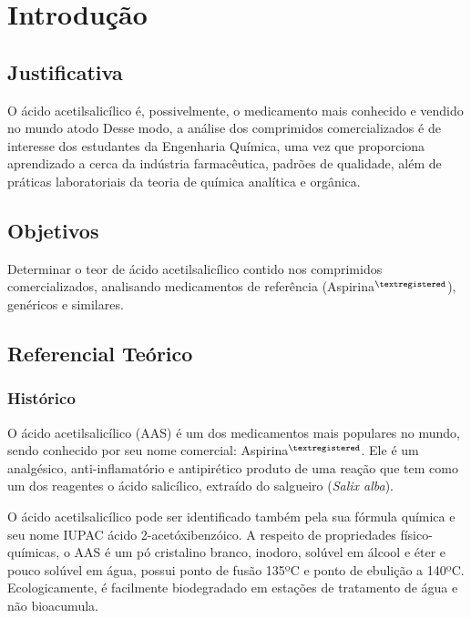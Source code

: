 \chapter{Introdução}\label{intro}
\section{Justificativa}\label{sub:just}    

O ácido acetilsalicílico é, possivelmente, o medicamento mais conhecido e vendido no mundo atodo
Desse modo, a análise dos comprimidos comercializados é de interesse dos estudantes da Engenharia Química,
uma vez que proporciona aprendizado a cerca da indústria farmacêutica, padrões de qualidade, além de
práticas laboratoriais da teoria de química analítica e orgânica.

\section{Objetivos}\label{sub:Objetivos}
Determinar o teor de ácido acetilsalicílico contido nos comprimidos comercializados, analisando
medicamentos de referência (Aspirina$^{\tiny{\textregistered}}$), genéricos e similares.

\section{Referencial Teórico}\label{sub:reft}

\subsection{Histórico}\label{sub:Histórico}

O ácido acetilsalicílico (AAS) é um dos medicamentos mais populares no mundo, sendo conhecido por seu nome
comercial: Aspirina$^{\tiny{\textregistered}}$. Ele é um analgésico, anti-inflamatório e antipirético
produto de uma reação que tem como um dos reagentes o ácido salicílico, extraído do salgueiro (\textit{Salix
    alba}).  

O ácido acetilsalicílico pode ser identificado também pela sua fórmula química  e seu nome IUPAC
ácido 2-acetóxibenzóico. A respeito de propriedades físico-químicas, o AAS é um pó cristalino branco,
inodoro, solúvel em álcool e éter e pouco solúvel em água, possui ponto de fusão 135ºC e ponto de ebulição
a 140ºC. Ecologicamente, é facilmente biodegradado em estações de tratamento de água e não bioacumula.
\cite{teves}

